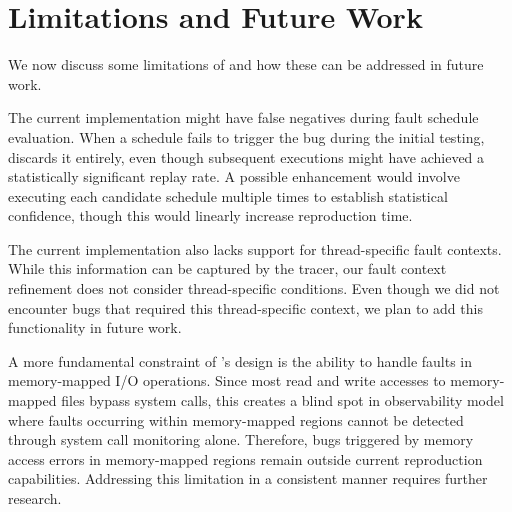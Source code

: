 \section{Limitations and Future Work}
We now discuss some limitations of \sys and how these can be addressed in future work.

The current implementation might have false negatives during fault schedule evaluation.
When a schedule fails to trigger the bug during the initial testing, \sys discards it entirely, even though subsequent executions might have achieved a statistically significant replay rate.
A possible enhancement would involve executing each candidate schedule multiple times to establish statistical confidence, though this would linearly increase reproduction time.


The current implementation also lacks support for thread-specific fault contexts.
While this information can be captured by the tracer, our fault context refinement does not consider thread-specific conditions.
Even though we did not encounter bugs that required this thread-specific context, we plan to add this functionality in future work.


A more fundamental constraint of \sys's design is the ability to handle faults in memory-mapped I/O operations.
Since most read and write accesses to memory-mapped files bypass system calls, this creates a blind spot in \sys observability model where faults occurring within memory-mapped regions cannot be detected through system call monitoring alone.
Therefore, bugs triggered by memory access errors in memory-mapped regions remain outside \sys current reproduction capabilities.
Addressing this limitation in a consistent manner requires further research.


